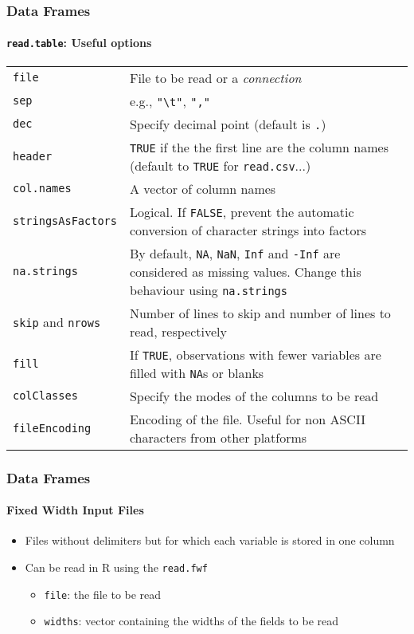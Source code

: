 \documentclass[paper=screen,mathserif]{beamer}\usepackage[]{graphicx}\usepackage[]{color}
\newcommand{\ft}[1]{\frametitle{#1}}
\newcommand{\fst}[1]{\framesubtitle{#1}}
\begin{document}
\begin{frame}[fragile]
  \ft{Data Frames}
  \fst{{\tt read.table}: Useful options}
  
  \begin{center} 
    {\scriptsize
    \begin{tabular}{lp{7cm}} 
      \toprule
      {\tt file}                 & File to be read or a {\em connection}      \\
      {\tt sep}                  & e.g., \verb="\t"=, {\tt ","}               \\
      {\tt dec}                  & Specify decimal point (default is {\tt .}) \\
      {\tt header}               & {\tt TRUE} if the the first line are the column
      names (default to {\tt TRUE} for {\tt read.csv}...)                     \\
      {\tt col.names}            & A vector of column names                   \\
      {\tt stringsAsFactors}     & Logical. If {\tt FALSE}, prevent the
      automatic conversion of character strings into factors                  \\
      {\tt na.strings}           & By default, {\tt NA}, {\tt NaN}, {\tt Inf}
      and {\tt -Inf} are considered as missing values. Change this
      behaviour using {\tt na.strings}                                        \\ 
      {\tt skip} and {\tt nrows} & Number of lines to skip and number
      of lines to read, respectively                                          \\
      {\tt fill}                 & If {\tt TRUE}, observations with
      fewer variables are filled with {\tt NA}s or blanks                     \\
      {\tt colClasses}           & Specify the modes of the columns to
      be read                                                                 \\
      \verb=fileEncoding=        & Encoding of the file. Useful for
      non ASCII characters from other platforms                         \\
      \bottomrule
    \end{tabular}}
  \end{center}
\end{frame}

\begin{frame}[fragile]
  \ft{Data Frames}
  \fst{Fixed Width Input Files}
  \begin{itemize}
  \item Files without delimiters but for which each variable is stored
    in one column
  \item Can be read in R using the {\tt read.fwf}
    \begin{itemize}
    \item {\tt file}: the file to be read
    \item {\tt widths}: vector containing the widths of the fields to
      be read
    \end{itemize}
  \end{itemize}
\end{frame}
\end{document}
